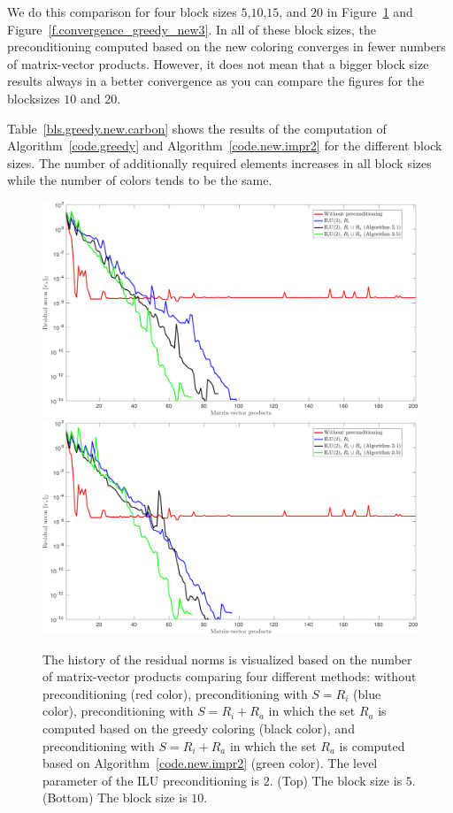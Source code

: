 \documentclass[12pt, twoside,a4paper,toc=bibliography]{scrbook}
\newcommand{\figref}[1]{Figure~\protect\ref{#1}}
\newcommand{\coderef}[1]{Algorithm~\protect\ref{#1}}
\begin{document}
We do this comparison for four block sizes $5$,$10$,$15$, and $20$ in
\figref{f.convergence_greedy_new2} and \figref{f.convergence_greedy_new3}.
In all of these block sizes, the preconditioning computed based
on the new coloring converges in fewer numbers of matrix-vector products.
However, it does not mean that a bigger block size results always in a better convergence
as you can compare the figures for the blocksizes $10$ and $20$.

Table~\ref{bls.greedy.new.carbon} shows the results of the computation of \coderef{code.greedy} and
\coderef{code.new.impr2} for the different block sizes.
The number of additionally required elements increases in all block sizes
while the number of colors tends to be the same.

\begin{figure}
\centering
\includegraphics[width=\linewidth]{jac_convergence_greedy_new_5.jpg}
\includegraphics[width=\linewidth]{jac_convergence_greedy_new_10.jpg}
\caption{
The history of the residual norms is visualized based on
the number of matrix-vector products comparing four different methods:
without preconditioning (red color),
preconditioning with $S=R_i$ (blue color),
preconditioning with $S=R_i + R_a$ in which
the set $R_a$ is computed based on the greedy coloring (black color),
and preconditioning with $S=R_i + R_a$ in which
the set $R_a$ is computed based on \coderef{code.new.impr2} (green color).
The level parameter of the ILU preconditioning is $2$.
(Top) The block size is $5$.
(Bottom) The block size is $10$.
}
\label{f.convergence_greedy_new2}
\end{figure}
\end{document}
